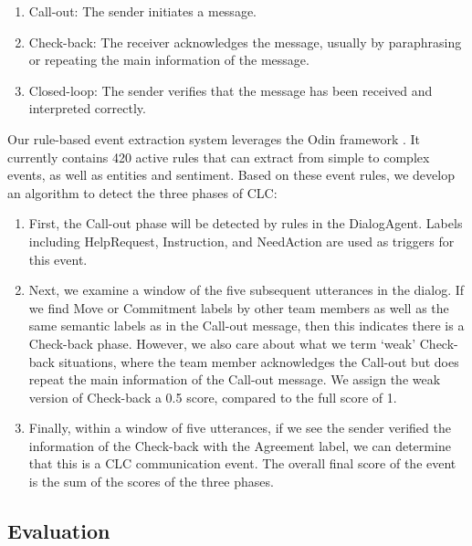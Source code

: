 \begin{enumerate}
    \item Call-out: The sender initiates a message.
    \item Check-back: The receiver acknowledges the message, usually by
        paraphrasing or repeating the main information of the message.
    \item Closed-loop: The sender verifies that the message has been received
        and interpreted correctly.
\end{enumerate}

Our rule-based event extraction system leverages the Odin framework
\cite{valenzuela-escarcega-etal-2016-odins}. It currently contains 420 active
rules that can extract from simple to complex events, as well as entities and
sentiment. Based on these event rules, we develop an algorithm to detect the
three phases of CLC:

\begin{enumerate}

    \item First, the Call-out phase will be detected by rules in the
        DialogAgent.  Labels including HelpRequest, Instruction, and NeedAction
        are used as triggers for this event.

    \item Next, we examine a window of the five subsequent utterances in the
        dialog. If we find Move or Commitment labels by other team members as
        well as the same semantic labels as in the Call-out message, then this
        indicates there is a Check-back phase. However, we also care about what
        we term `weak' Check-back situations, where the team member
        acknowledges the Call-out but does repeat the main information of the
        Call-out message. We assign the weak version of Check-back a 0.5 score,
        compared to the full score of 1. 

    \item Finally, within a window of five utterances, if we see the sender
        verified the information of the Check-back with the Agreement label, we
        can determine that this is a CLC communication event. The overall final
        score of the event is the sum of the scores of the three phases.

\end{enumerate}

\subsection{Evaluation}

